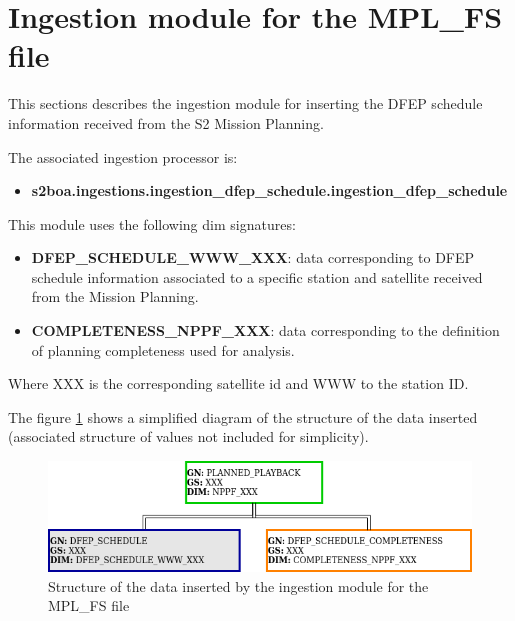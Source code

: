 \section{Ingestion module for the MPL\_FS file}

This sections describes the ingestion module for inserting the DFEP schedule information received from the S2 Mission Planning.

The associated ingestion processor is:

\begin{itemize} 

\item \textbf{s2boa.ingestions.ingestion\_dfep\_schedule.ingestion\_dfep\_schedule}
  
\end{itemize}

This module uses the following \acrshort{dim} signatures:

\begin{itemize} 

\item \textbf{DFEP\_SCHEDULE\_WWW\_XXX}: data corresponding to DFEP schedule information associated to a specific station and satellite received from the Mission Planning.

\item \textbf{COMPLETENESS\_NPPF\_XXX}: data corresponding to the definition of planning completeness used for analysis.
  
\end{itemize}

Where XXX is the corresponding satellite id and WWW to the station ID.

The figure \ref{fg:structure_ingestion_dfep_schedule} shows a simplified diagram of the structure of the data inserted (associated structure of values not included for simplicity).

\begin{figure}[H]
  \begin{center}
	\centering\includegraphics[width=150mm]{../fig/structure_ingestion_dfep_schedule.png}
	\caption{Structure of the data inserted by the ingestion module for the MPL\_FS file}
	\label{fg:structure_ingestion_dfep_schedule}
  \end{center}
\end{figure}

